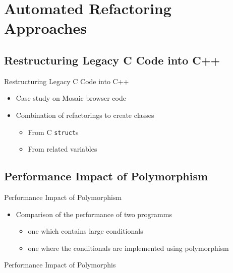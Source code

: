 \documentclass{beamer}
\begin{document}
\section{Automated Refactoring Approaches}

\subsection{Restructuring Legacy C Code into C++}

\begin{frame}{Restructuring Legacy C Code into C++}
  
  \begin{itemize}
    \item Case study on Mosaic browser code
    \pause
    \item Combination of refactorings to create classes
    \begin{itemize}
      \item From C \texttt{struct}s
      \item From related variables
    \end{itemize}
  \end{itemize}
\end{frame}

\subsection{Performance Impact of Polymorphism}

\begin{frame}{Performance Impact of Polymorphism}
  
  \begin{itemize}
    \item Comparison of the performance of two programms
    \begin{itemize}
      \item one which contains large conditionals
      \item one where the conditionals are implemented using polymorphism
    \end{itemize}
  \end{itemize}
\end{frame}

\begin{frame}[fragile]{Performance Impact of Polymorphis}
  \begin{columns}[T]
    \begin{column}{.49\textwidth}
      
    \end{column}
    \begin{column}{.5\textwidth}
      
    \end{column}
  \end{columns}
\end{frame}
\end{document}
